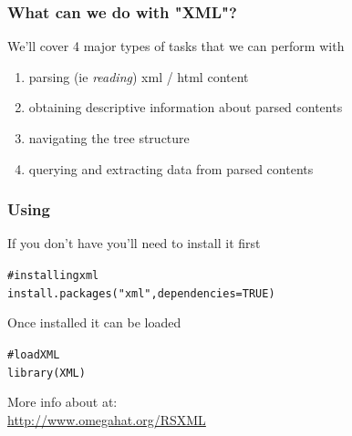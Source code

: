 \documentclass{beamer}\usepackage[]{graphicx}\usepackage[]{color}
\makeatletter
\newcommand{\hlnum}[1]{\textcolor[rgb]{0.063,0.58,0.627}{#1}}%
\newcommand{\hlstr}[1]{\textcolor[rgb]{0.063,0.58,0.627}{#1}}%
\newcommand{\hlcom}[1]{\textcolor[rgb]{0.588,0.588,0.588}{#1}}%
\newcommand{\hlstd}[1]{\textcolor[rgb]{0.196,0.196,0.196}{#1}}%
\newcommand{\hlkwc}[1]{\textcolor[rgb]{0,0.631,0.314}{#1}}%
\newcommand{\hlkwd}[1]{\textcolor[rgb]{0.78,0.227,0.412}{#1}}%
\newenvironment{kframe}{%
 \def\at@end@of@kframe{}%
 \ifinner\ifhmode%
  \def\at@end@of@kframe{\end{minipage}}%
  \begin{minipage}{\columnwidth}%
 \fi\fi%
 \def\FrameCommand##1{\hskip\@totalleftmargin \hskip-\fboxsep
 \colorbox{shadecolor}{##1}\hskip-\fboxsep
     \hskip-\linewidth \hskip-\@totalleftmargin \hskip\columnwidth}%
 \MakeFramed {\advance\hsize-\width
   \@totalleftmargin\z@ \linewidth\hsize
   \@setminipage}}%
 {\par\unskip\endMakeFramed%
 \at@end@of@kframe}
\newenvironment{knitrout}{}{} %
\makeatother
\begin{document}

\begin{frame}
\frametitle{What can we do with "XML"?}

We'll cover 4 major types of tasks that we can perform with 
\begin{enumerate}
 \item parsing (ie \textit{reading}) xml / html content
 \item obtaining descriptive information about parsed contents
 \item navigating the tree structure 
 \item querying and extracting data from parsed contents
\end{enumerate}

\end{frame}


\begin{frame}[fragile]
\frametitle{Using }

If you don't have  you'll need to install it first
\begin{knitrout}\tiny
{}\color{fgcolor}\begin{kframe}
\begin{alltt}
\hlcom{# installing xml}
\hlkwd{install.packages}\hlstd{(}\hlstr{"xml"}\hlstd{,} \hlkwc{dependencies} \hlstd{=} \hlnum{TRUE}\hlstd{)}
\end{alltt}
\end{kframe}
\end{knitrout}

Once installed it can be loaded
\begin{knitrout}\tiny
{}\color{fgcolor}\begin{kframe}
\begin{alltt}
\hlcom{# load XML}
\hlkwd{library}\hlstd{(XML)}
\end{alltt}
\end{kframe}
\end{knitrout}

More info about  at: \\
{\scriptsize \url{http://www.omegahat.org/RSXML}}

\end{frame}

\end{document}
